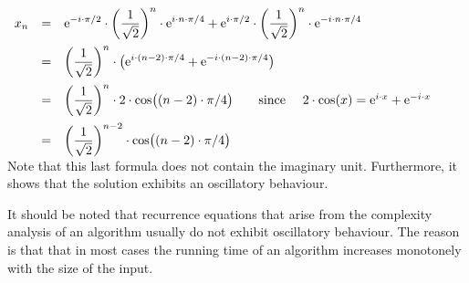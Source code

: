 \\[0.2cm]
\hspace*{1.3cm}
$
\begin{array}{lcl}
  x_n & = & \displaystyle  \mathrm{e}^{-i \cdot\pi/2} \cdot \left(\frac{1}{\sqrt{2}}\right)^n \cdot \mathrm{e}^{ i \cdot n \cdot\pi/4}
               + \mathrm{e}^{ i \cdot\pi/2} \cdot \left(\frac{1}{\sqrt{2}}\right)^n \cdot \mathrm{e}^{-i \cdot n \cdot\pi/4}
  \\[0.4cm]
  & = & \displaystyle \left(\frac{1}{\sqrt{2}}\right)^n \cdot \bigl(
        \mathrm{e}^{i \cdot (n - 2) \cdot \pi / 4} + \mathrm{e}^{-i \cdot (n - 2) \cdot \pi / 4} \bigr) \\[0.4cm]
  & = & \displaystyle \left(\frac{1}{\sqrt{2}}\right)^n \cdot 2 \cdot
        \cos\bigl((n - 2) \cdot \pi / 4\bigr) \qquad 
        \mbox{since \quad $2 \cdot \cos(x) = \mathrm{e}^{i\cdot x} + \mathrm{e}^{-i\cdot x}$}\\[0.4cm]
    & = & \displaystyle \left(\frac{1}{\sqrt{2}}\right)^{n-2} \cdot \cos\bigl((n - 2) \cdot \pi / 4\bigr)
\end{array}
$
\\[0.2cm]
Note that this last formula does not contain the imaginary unit.  Furthermore, it shows that the solution
exhibits an oscillatory behaviour.
\vspace*{0.2cm}

\remark
It should be noted that recurrence equations that arise from the complexity analysis of an algorithm usually do
not exhibit oscillatory behaviour.  The reason is that that in most cases the running time of an algorithm increases
monotonely with the size of the input. \eoxs

